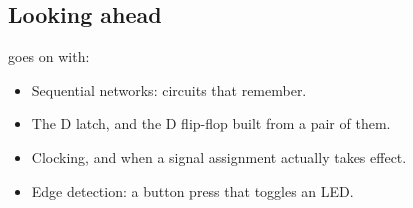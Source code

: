 \subsection*{Looking ahead}
 goes on with:
\begin{itemize}
  \item Sequential networks: circuits that remember.
  \item The D latch, and the D flip-flop built from a pair of them.
  \item Clocking, and when a signal assignment actually takes effect.
  \item Edge detection: a button press that toggles an LED.
\end{itemize}
